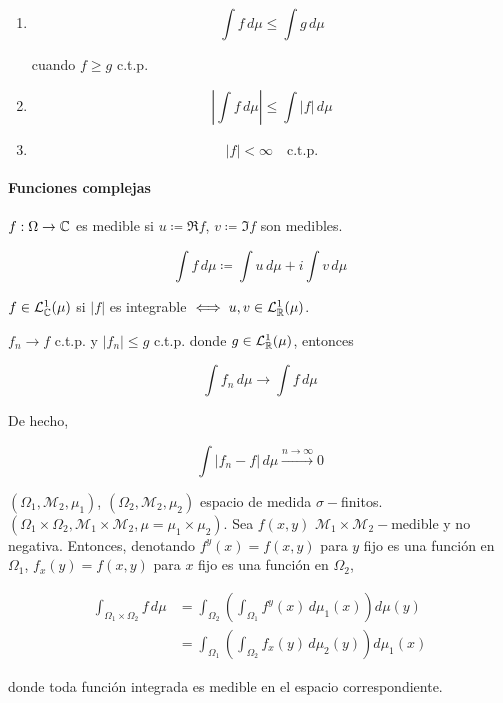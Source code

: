 \begin{enumerate}
    \item \[\int f\,d\mu\leq \int g\,d\mu\]

    cuando $f\geq g$ c.t.p.

    \item \[\left|\int f\,d\mu\right|\leq \int |f|\,d\mu\]
    \item \[|f|<\infty\quad \text{c.t.p.}\]
\end{enumerate}

\paragraph{Funciones complejas}\hfill

\begin{fdefinition}
    $f:\Omega\to\mathbb{C}$ es medible si $u\coloneqq \Re f$, $v\coloneqq \Im f$ son medibles.
\end{fdefinition}

\[\int f\,d\mu\coloneqq \int u\,d\mu + i\int v\,d\mu\]

\begin{fdefinition}
    $f\in \mathcal{L}_{\mathbb{C}}^1(\mu)$ si $|f|$ es integrable $\iff u,v\in \mathcal{L}_{\mathbb{R}}^1(\mu)$.
\end{fdefinition}

\begin{ftheorem}
    $f_n\to f$ c.t.p. y $|f_n|\leq g$ c.t.p. donde $g\in \mathcal{L}_{\mathbb{R}}^1(\mu)$, entonces 

    \[\int f_n\,d\mu\to \int f\,d\mu\]

    De hecho, 

    \[\int |f_n-f|\,d\mu\xrightarrow{n\to\infty}0\]
\end{ftheorem}

\begin{ftheorem}[Tonelli]
    $(\Omega_1,\mathcal{M}_2,\mu_1)$, $(\Omega_2,\mathcal{M}_2,\mu_2)$ espacio de medida $\sigma-$finitos. $(\Omega_1\times\Omega_2,\mathcal{M}_1\times\mathcal{M}_2,\mu=\mu_1\times\mu_2)$. Sea $f(x,y)$ $\mathcal{M}_1\times\mathcal{M}_2-$medible y no negativa. Entonces, denotando $f^y(x)=f(x,y)$ para $y$ fijo es una función en $\Omega_1$, $f_x(y)=f(x,y)$ para $x$ fijo es una función en $\Omega_2$,

    \begin{align*}
        \int_{\Omega_1\times\Omega_2}f\,d\mu&=\int_{\Omega_2}\left(\int_{\Omega_1} f^y(x)\,d\mu_1(x)\right)d\mu(y)\\
        &=\int_{\Omega_1}\left(\int_{\Omega_2} f_x(y)\,d\mu_2(y)\right)d\mu_1(x)
    \end{align*}

    donde toda función integrada es medible en el espacio correspondiente.

\end{ftheorem}

